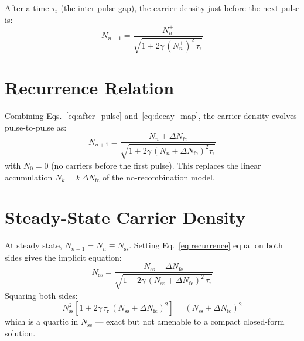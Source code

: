 \documentclass[11pt,a4paper]{article}
\begin{document}
After a time $\tau_\text{r}$ (the inter-pulse gap), the carrier density just before the next pulse is:
\begin{equation}
N_{n+1} = \frac{N_n^{+}}{\sqrt{1 + 2\gamma\,(N_n^{+})^2\,\tau_\text{r}}}
\label{eq:decay_map}
\end{equation}

\section{Recurrence Relation}

Combining Eqs.~\eqref{eq:after_pulse} and~\eqref{eq:decay_map}, the carrier density evolves pulse-to-pulse as:
\begin{equation}
\boxed{N_{n+1} = \frac{N_n + \Delta N_\text{fc}}{\sqrt{1 + 2\gamma\,\left(N_n + \Delta N_\text{fc}\right)^2 \tau_\text{r}}}}
\label{eq:recurrence}
\end{equation}
with $N_0 = 0$ (no carriers before the first pulse). This replaces the linear accumulation $N_k = k\,\Delta N_\text{fc}$ of the no-recombination model.

\section{Steady-State Carrier Density}

At steady state, $N_{n+1} = N_n \equiv N_\text{ss}$. Setting Eq.~\eqref{eq:recurrence} equal on both sides gives the implicit equation:
\begin{equation}
\boxed{N_\text{ss} = \frac{N_\text{ss} + \Delta N_\text{fc}}{\sqrt{1 + 2\gamma\,(N_\text{ss} + \Delta N_\text{fc})^2\,\tau_\text{r}}}}
\label{eq:ss_implicit}
\end{equation}
Squaring both sides:
\begin{equation}
N_\text{ss}^2\left[1 + 2\gamma\,\tau_\text{r}\,(N_\text{ss} + \Delta N_\text{fc})^2\right] = (N_\text{ss} + \Delta N_\text{fc})^2
\label{eq:ss_squared}
\end{equation}
which is a quartic in $N_\text{ss}$ --- exact but not amenable to a compact closed-form solution.
\end{document}
